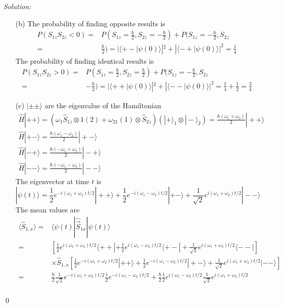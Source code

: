\documentclass[12pt,a4paper]{article}
\newenvironment{sol}
    {\emph{Solution:}
    }
    {
    \qed
    }
\begin{document}
\begin{sol}
\begin{itemize}
\item[(b)] The probability of finding opposite results is
\begin{align}
\nonumber P(S_{1z}S_{2z}<0)=&P(S_{1z}=\frac{\hbar}{2},S_{2z}=-\frac{\hbar}{2})+P(S_{1z}=-\frac{\hbar}{2},S_{2z}\\
=&\frac{\hbar}{2})=|\langle+-|\psi(0)\rangle|^2+|\langle-+|\psi(0)\rangle|^2=\frac{1}{4}
\end{align}
The probability of finding identical results is
\begin{align}
\nonumber P(S_{1z}S_{2z}>0)=&P(S_{1z}=\frac{\hbar}{2},S_{2z}=\frac{\hbar}{2})+P(S_{1z}=-\frac{\hbar}{2},S_{2z}\\
=&-\frac{\hbar}{2})=|\langle++|\psi(0)\rangle|^2+|\langle--|\psi(0)\rangle|^2=\frac{1}{4}+\frac{1}{2}=\frac{3}{4}
\end{align}
\item[(c)] $|\pm\pm\rangle$ are the eigenvalue of the Hamiltonian
\begin{gather}
\hat{H}|++\rangle=(\omega_1\hat{S}_{1z}\otimes1(2)+\omega_21(1)\otimes\hat{S}_{2z})(|+\rangle_1\otimes|-\rangle_2)=\frac{\hbar(\omega_1+\omega_2)}{2}|++\rangle\\
\hat{H}|+-\rangle=\frac{\hbar(\omega_1-\omega_2)}{2}|+-\rangle\\
\hat{H}|-+\rangle=\frac{\hbar(-\omega_1+\omega_2)}{2}|-+\rangle\\
\hat{H}|--\rangle=\frac{\hbar(-\omega_1-\omega_2)}{2}|--\rangle
\end{gather}
The eigenvector at time $t$ is
\begin{equation}
|\psi(t)\rangle=\frac{1}{2}e^{-i(\omega_1+\omega_2)t/2}|++\rangle+\frac{1}{2}e^{-i(\omega_1-\omega_2)t/2}|+-\rangle+\frac{1}{\sqrt{2}}e^{i(\omega_1+\omega_2)t/2}|--\rangle
\end{equation}
The mean values are
\begin{align}
\nonumber\langle\hat{S}_{1,x}\rangle=&\langle\psi(t)|\hat{\vec{S}}_{1x}|\psi(t)\rangle\\
\nonumber=&[\frac{1}{2}e^{i(\omega_1+\omega_2)t/2}\langle++|+\frac{1}{2}e^{i(\omega_1-\omega_2)t/2}\langle+-|+\frac{1}{\sqrt{2}}e^{i(\omega_1+\omega_2)t/2}\langle--|]\\
\nonumber&\times\hat{S}_{1,x}[\frac{1}{2}e^{-i(\omega_1+\omega_2)t/2}|++\rangle+\frac{1}{2}e^{-i(\omega_1-\omega_2)t/2}|+-\rangle+\frac{1}{\sqrt{2}}e^{i(\omega_1+\omega_2)t/2}|--\rangle]\\
\nonumber=&\frac{\hbar}{2}\frac{1}{\sqrt{2}}e^{-i(\omega_1+\omega_2)t/2}\frac{1}{2}e^{-i(\omega_1-\omega_2)t/2}+\frac{\hbar}{2}\frac{1}{2}e^{i(\omega_1-\omega_2)t/2}\frac{1}{\sqrt{2}}e^{i(\omega_1+\omega_2)t/2}\\

\end{align}
\end{itemize}
\end{sol}
\end{document}
